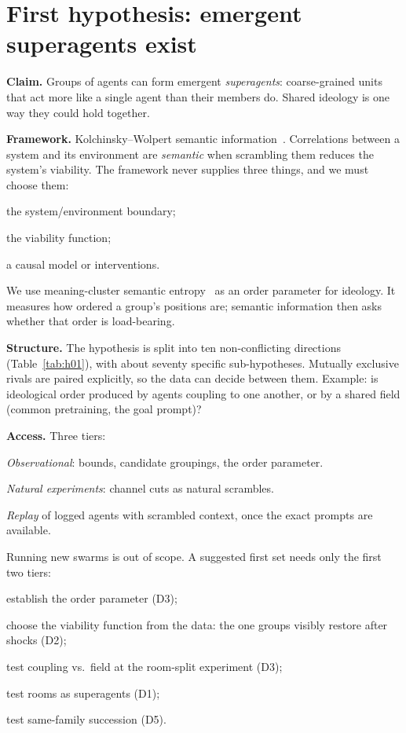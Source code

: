\documentclass[reprint,aps,pre,10pt,superscriptaddress,nofootinbib]{revtex4-2}
\newenvironment{tight}{\begin{list}{\textbullet}{\setlength{\itemsep}{0pt}\setlength{\parsep}{0pt}\setlength{\topsep}{2pt}\setlength{\partopsep}{0pt}\setlength{\leftmargin}{1.1em}\setlength{\labelwidth}{0.6em}\setlength{\labelsep}{0.4em}}}{\end{list}}
\begin{document}
\section{First hypothesis: emergent superagents exist}

\textbf{Claim.} Groups of agents can form emergent \emph{superagents}: coarse-grained units that act more like a single agent than their members do. Shared ideology is one way they could hold together.

\textbf{Framework.} Kolchinsky--Wolpert semantic information~\cite{kolchinsky2018}. Correlations between a system and its environment are \emph{semantic} when scrambling them reduces the system's viability. The framework never supplies three things, and we must choose them:
\begin{tight}
\item the system/environment boundary;
\item the viability function;
\item a causal model or interventions.
\end{tight}
We use meaning-cluster semantic entropy~\cite{farquhar2024} as an order parameter for ideology. It measures how ordered a group's positions are; semantic information then asks whether that order is load-bearing.

\textbf{Structure.} The hypothesis is split into ten non-conflicting directions (Table~\ref{tab:h01}), with about seventy specific sub-hypotheses. Mutually exclusive rivals are paired explicitly, so the data can decide between them. Example: is ideological order produced by agents coupling to one another, or by a shared field (common pretraining, the goal prompt)?

\textbf{Access.} Three tiers:
\begin{tight}
\item \emph{Observational}: bounds, candidate groupings, the order parameter.
\item \emph{Natural experiments}: channel cuts as natural scrambles.
\item \emph{Replay} of logged agents with scrambled context, once the exact prompts are available.
\end{tight}
Running new swarms is out of scope. A suggested first set needs only the first two tiers:
\begin{tight}
\item establish the order parameter (D3);
\item choose the viability function from the data: the one groups visibly restore after shocks (D2);
\item test coupling vs.\ field at the room-split experiment (D3);
\item test rooms as superagents (D1);
\item test same-family succession (D5).
\end{tight}
\end{document}
